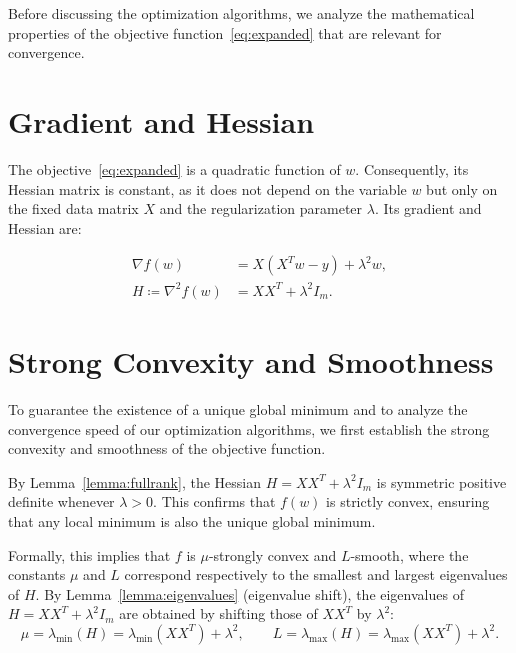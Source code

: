 \label{sec:properties}

\noindent Before discussing the optimization algorithms, we analyze the mathematical
properties of the objective function~\eqref{eq:expanded} that are relevant for
convergence.


\section{Gradient and Hessian}

\noindent The objective~\eqref{eq:expanded} is a quadratic function of $w$.
Consequently, its Hessian matrix is constant, as it does not depend on the
variable $w$ but only on the fixed data matrix $X$ and the regularization
parameter $\lambda$. Its gradient and Hessian are:

\begin{align}
    \nabla f(w) &= X(X^T w - y) + \lambda^2 w,
    \label{eq:gradient} \\
    H \coloneqq \nabla^2 f(w) &= XX^T + \lambda^2 I_m.
    \label{eq:hessian}
\end{align}


\section{Strong Convexity and Smoothness}

\noindent To guarantee the existence of a unique global minimum and to analyze the
convergence speed of our optimization algorithms, we first establish the strong
convexity and smoothness of the objective function.

\noindent By Lemma~\ref{lemma:fullrank}, the Hessian $H = XX^T + \lambda^2 I_m$
is symmetric positive definite whenever $\lambda > 0$. This confirms that $f(w)$
is strictly convex, ensuring that any local minimum is also the unique global
minimum.

\noindent Formally, this implies that $f$ is $\mu$-strongly convex and $L$-smooth,
where the constants $\mu$ and $L$ correspond respectively to the smallest and
largest eigenvalues of $H$. By Lemma~\ref{lemma:eigenvalues} (eigenvalue shift),
the eigenvalues of $H = XX^T + \lambda^2 I_m$ are obtained by shifting those of
$XX^T$ by $\lambda^2$:
\begin{equation}
\label{eq:muL}
    \mu = \lambda_{\min}(H) = \lambda_{\min}(XX^T) + \lambda^2,
    \qquad
    L   = \lambda_{\max}(H) = \lambda_{\max}(XX^T) + \lambda^2.
\end{equation}

